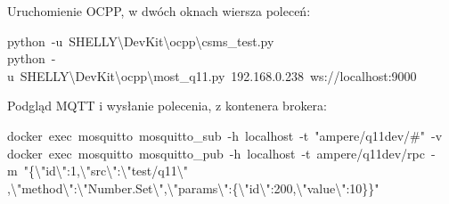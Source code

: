 \documentclass[11pt,a4paper]{article}
\begin{document}
Uruchomienie OCPP, w dwóch oknach wiersza poleceń:


\begin{kodbox}
python\ -u\ SHELLY\textbackslash{}DevKit\textbackslash{}ocpp\textbackslash{}csms\_test.py\\
python\ -u\ SHELLY\textbackslash{}DevKit\textbackslash{}ocpp\textbackslash{}most\_q11.py\ 192.168.0.238\ ws://localhost:9000
\end{kodbox}

Podgląd MQTT i wysłanie polecenia, z kontenera brokera:


\begin{kodbox}
docker\ exec\ mosquitto\ mosquitto\_sub\ -h\ localhost\ -t\ "ampere/q11dev/\#"\ -v\\
docker\ exec\ mosquitto\ mosquitto\_pub\ -h\ localhost\ -t\ ampere/q11dev/rpc\ -m\ "\{\textbackslash{}"id\textbackslash{}":1,\textbackslash{}"src\textbackslash{}":\textbackslash{}"test/q11\textbackslash{}"\\
\hspace*{1.2em},\textbackslash{}"method\textbackslash{}":\textbackslash{}"Number.Set\textbackslash{}",\textbackslash{}"params\textbackslash{}":\{\textbackslash{}"id\textbackslash{}":200,\textbackslash{}"value\textbackslash{}":10\}\}"
\end{kodbox}
\end{document}
